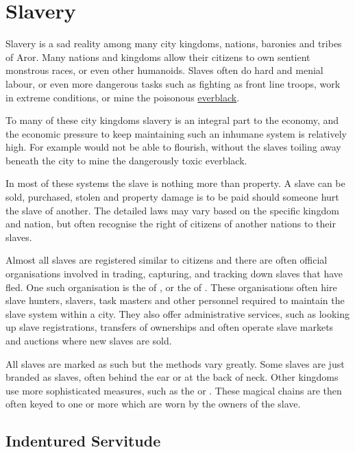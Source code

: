 \section{Slavery}
\label{sec:Slavery}

Slavery is a sad reality among many city kingdoms, nations, baronies and
tribes of Aror. Many nations and kingdoms allow their citizens to own
sentient monstrous races, or even other humanoids. Slaves often do
hard and menial labour, or even more dangerous tasks such as fighting
as front line troops, work in extreme conditions, or mine the poisonous
\hyperref[sec:Everblack]{everblack}.

To many of these city kingdoms slavery is an integral part to the economy,
and the economic pressure to keep maintaining such an inhumane system
is relatively high. For example  would not be able
to flourish, without the slaves toiling away beneath the city to mine
the dangerously toxic everblack.

In most of these systems the slave is nothing more than property. A slave
can be sold, purchased, stolen and property damage is to be paid should
someone hurt the slave of another. The detailed laws may vary based on
the specific kingdom and nation, but often recognise the right of citizens
of another nations to their slaves.

Almost all slaves are registered similar to citizens and there are often
official organisations involved in trading, capturing, and tracking down
slaves that have fled. One such organisation is the  of , or the  of
. These organisations often hire slave hunters,
slavers, task masters and other personnel required to maintain the slave
system within a city. They also offer administrative services, such as looking
up slave registrations, transfers of ownerships and often operate slave
markets and auctions where new slaves are sold.

All slaves are marked as such but the methods vary greatly. Some slaves
are just branded as slaves, often behind the ear or at the back of neck.
Other kingdoms use more sophisticated measures, such as the
 or . These magical
chains are then often keyed to one or more  which
are worn by the owners of the slave.

\subsection{Indentured Servitude}
\label{sec:Indentured Servitude}


